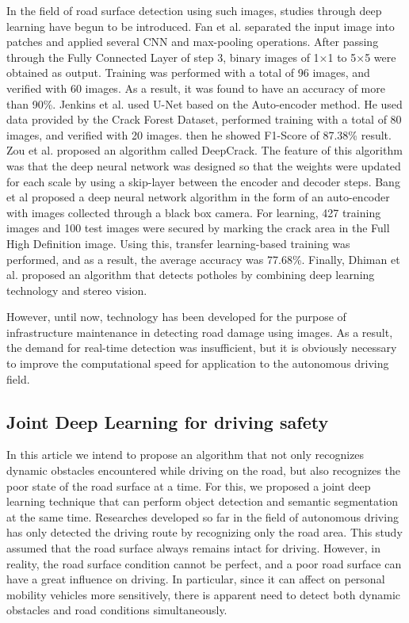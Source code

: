 \documentclass{ieeeaccess}
\begin{document}
In the field of road surface detection using such images, studies through deep learning have begun to be introduced. Fan et al.\cite{b44} separated the input image into patches and applied several CNN and max-pooling operations. After passing through the Fully Connected Layer of step 3, binary images of 1×1 to 5×5 were obtained as output. Training was performed with a total of 96 images, and verified with 60 images. As a result, it was found to have an accuracy of more than 90\%. Jenkins et al.\cite{b37} used U-Net\cite{b38} based on the Auto-encoder method. He used data provided by the Crack Forest Dataset\cite{b45}, performed training with a total of 80 images, and verified with 20 images. then he showed F1-Score of 87.38\% result. Zou et al.\cite{b39} proposed an algorithm called DeepCrack. The feature of this algorithm was that the deep neural network was designed so that the weights were updated for each scale by using a skip-layer between the encoder and decoder steps. Bang et al \cite{b40} proposed a deep neural network algorithm in the form of an auto-encoder with images collected through a black box camera. For learning, 427 training images and 100 test images were secured by marking the crack area in the Full High Definition image. Using this, transfer learning-based training was performed, and as a result, the average accuracy was 77.68\%. Finally, Dhiman et al. \cite{b41} proposed an algorithm that detects potholes by combining deep learning technology and stereo vision.

However, until now, technology has been developed for the purpose of infrastructure maintenance in detecting road damage using images. As a result, the demand for real-time detection was insufficient, but it is obviously necessary to improve the computational speed for application to the autonomous driving field.

\subsection{Joint Deep Learning for driving safety}
\label{subsec: joint deep learning}
In this article we intend to propose an algorithm that not only recognizes dynamic obstacles encountered while driving on the road, but also recognizes the poor state of the road surface at a time. For this, we proposed a joint deep learning technique that can perform object detection and semantic segmentation at the same time. Researches developed so far in the field of autonomous driving \cite{b42, b43} has only detected the driving route by recognizing only the road area. This study assumed that the road surface always remains intact for driving. However, in reality, the road surface condition cannot be perfect, and a poor road surface can have a great influence on driving. In particular, since it can affect on personal mobility vehicles more sensitively, there is apparent need to detect both dynamic obstacles and road conditions simultaneously.
\end{document}
